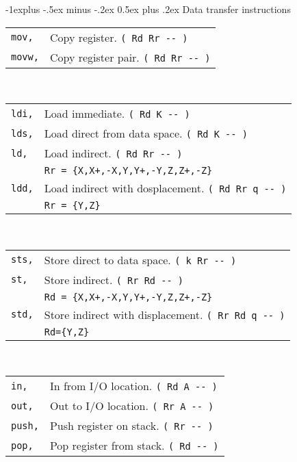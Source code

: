 \documentclass[10pt,landscape,a4paper]{article}
\makeatletter
\renewcommand{\subsection}{\@startsection{subsection}{2}{0mm}%
                                {-1explus -.5ex minus -.2ex}%
                                {0.5ex plus .2ex}%
                                {\normalfont\normalsize\bfseries}}
\makeatother
\begin{document}
\begin{multicols}{3}
\subsection{Data transfer instructions}
\begin{tabular}{@{}ll@{}}
\verb!mov,! & Copy register. \verb!( Rd Rr -- )! \\
\verb!movw,! & Copy register pair. \verb!( Rd Rr -- )! \\
\end{tabular}\\
\begin{tabular}{@{}ll@{}}
\verb!ldi,! & Load immediate. \verb!( Rd K -- )! \\
\verb!lds,! & Load direct from data space. \verb!( Rd K -- )! \\
\verb!ld,! & Load indirect. \verb!( Rd Rr -- )! \\
           & \verb!Rr = {X,X+,-X,Y,Y+,-Y,Z,Z+,-Z}! \\
\verb!ldd,! & Load indirect with dosplacement. \verb!( Rd Rr q -- )! \\
            & \verb!Rr = {Y,Z}! \\
\end{tabular}\\
\begin{tabular}{@{}ll@{}}
\verb!sts,! & Store direct to data space. \verb!( k Rr -- )! \\
\verb!st,! & Store indirect. \verb!( Rr Rd -- )! \\
           & \verb!Rd = {X,X+,-X,Y,Y+,-Y,Z,Z+,-Z}! \\
\verb!std,! & Store indirect with displacement. \verb!( Rr Rd q -- )! \\
            & \verb!Rd={Y,Z}! \\
\end{tabular}\\
\begin{tabular}{@{}ll@{}}
\verb!in,! & In from I/O location. \verb!( Rd A -- )! \\
\verb!out,! & Out to I/O location. \verb!( Rr A -- )! \\
\verb!push,! & Push register on stack. \verb!( Rr -- )! \\
\verb!pop,! & Pop register from stack. \verb!( Rd -- )! \\
\end{tabular}\\


\end{multicols}
\end{document}
